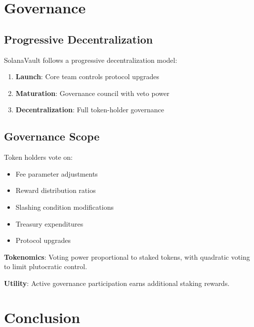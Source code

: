 \documentclass[12pt,a4paper]{article}
\begin{document}
\section{Governance}

\subsection{Progressive Decentralization}

SolanaVault follows a progressive decentralization model:

\begin{enumerate}
    \item \textbf{Launch}: Core team controls protocol upgrades
    \item \textbf{Maturation}: Governance council with veto power
    \item \textbf{Decentralization}: Full token-holder governance
\end{enumerate}

\subsection{Governance Scope}

Token holders vote on:

\begin{itemize}
    \item Fee parameter adjustments
    \item Reward distribution ratios
    \item Slashing condition modifications
    \item Treasury expenditures
    \item Protocol upgrades
\end{itemize}

\noindent\textbf{Tokenomics}: Voting power proportional to staked tokens, with quadratic voting to limit plutocratic control.

\noindent\textbf{Utility}: Active governance participation earns additional staking rewards.

\section{Conclusion}
\end{document}
